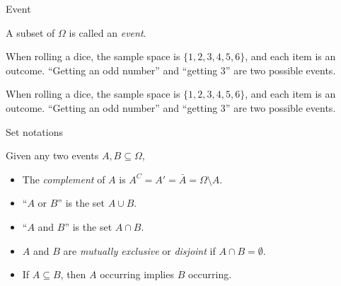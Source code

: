 %
\begin{note}
  \begin{field}
    Event
  \end{field}
  \begin{field}
    \begin{defi}[Event]
      A subset of $\Omega$ is called an \emph{event}.
    \end{defi}
  \end{field}
  \xplain{}%
\end{note}

\begin{note}
  \begin{field}
    \begin{eg}
      When rolling a dice, the sample space is $\{1, 2, 3, 4, 5, 6\}$, and each item is an outcome. ``Getting an odd number'' and ``getting 3'' are two possible events.
    \end{eg}
  \end{field}
  \begin{field}
    \begin{eg}
      When rolling a dice, the sample space is $\{1, 2, 3, 4, 5, 6\}$, and each item is an outcome. ``Getting an odd number'' and ``getting 3'' are two possible events.
    \end{eg}
  \end{field}
  \xplain{}%
\end{note}

%
\begin{note}
  \begin{field}
    Set notations
  \end{field}
  \begin{field}
    \begin{defi}
      Given any two events $A, B\subseteq \Omega$,
      \begin{itemize}
        \item The \emph{complement} of $A$ is $A^C = A' = \bar A = \Omega\setminus A$.
        \item ``$A$ or $B$'' is the set $A\cup B$.
        \item ``$A$ and $B$'' is the set $A\cap B$.
        \item $A$ and $B$ are \emph{mutually exclusive} or \emph{disjoint} if $A\cap B = \emptyset$.
        \item If $A\subseteq B$, then $A$ occurring implies $B$ occurring.
      \end{itemize}
    \end{defi}
  \end{field}
  \xplain{}%
\end{note}

